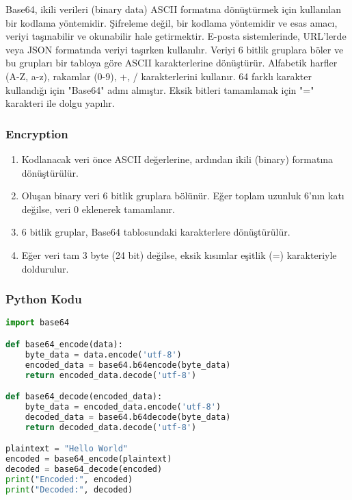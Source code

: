 Base64, ikili verileri (binary data) ASCII formatına dönüştürmek için kullanılan bir kodlama yöntemidir. Şifreleme değil, bir kodlama yöntemidir ve esas amacı, veriyi taşınabilir ve okunabilir hale getirmektir. E-posta sistemlerinde, URL'lerde veya JSON formatında veriyi taşırken kullanılır. Veriyi 6 bitlik gruplara böler ve bu grupları bir tabloya göre ASCII karakterlerine dönüştürür. Alfabetik harfler (A-Z, a-z), rakamlar (0-9), +, / karakterlerini kullanır. 64 farklı karakter kullandığı için "Base64" adını almıştır. Eksik bitleri tamamlamak için "=" karakteri ile dolgu yapılır.

\subsubsection{Encryption}

\begin{enumerate}
    \item Kodlanacak veri önce ASCII değerlerine, ardından ikili (binary) formatına dönüştürülür.
    \item Oluşan binary veri 6 bitlik gruplara bölünür. Eğer toplam uzunluk 6'nın katı değilse, veri 0 eklenerek tamamlanır. 
    \item 6 bitlik gruplar, Base64 tablosundaki karakterlere dönüştürülür.
    \item Eğer veri tam 3 byte (24 bit) değilse, eksik kısımlar eşitlik (=) karakteriyle doldurulur.
\end{enumerate}

\subsubsection{Python Kodu}

\begin{lstlisting}[language=Python]
import base64

def base64_encode(data):
    byte_data = data.encode('utf-8')
    encoded_data = base64.b64encode(byte_data)
    return encoded_data.decode('utf-8')

def base64_decode(encoded_data):
    byte_data = encoded_data.encode('utf-8')
    decoded_data = base64.b64decode(byte_data)
    return decoded_data.decode('utf-8')

plaintext = "Hello World"
encoded = base64_encode(plaintext)
decoded = base64_decode(encoded)
print("Encoded:", encoded)
print("Decoded:", decoded)
\end{lstlisting}

\newpage

